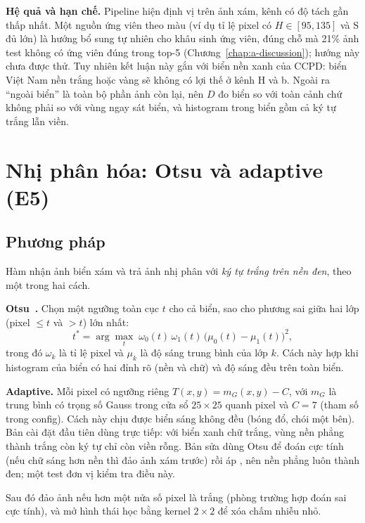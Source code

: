 \textbf{Hệ quả và hạn chế.} Pipeline hiện định vị trên ảnh xám, kênh có độ tách gần thấp nhất. Một nguồn ứng viên theo màu (ví dụ tỉ lệ pixel có $H\in[95,135]$ và S đủ lớn) là hướng bổ sung tự nhiên cho khâu sinh ứng viên, đúng chỗ mà 21\% ảnh test không có ứng viên đúng trong top-5 (Chương~\ref{chap:a-discussion}); hướng này chưa được thử. Tuy nhiên kết luận này gắn với biển nền xanh của CCPD: biển Việt Nam nền trắng hoặc vàng sẽ không có lợi thế ở kênh H và b. Ngoài ra ``ngoài biển'' là toàn bộ phần ảnh còn lại, nên $D$ đo biển so với toàn cảnh chứ không phải so với vùng ngay sát biển, và histogram trong biển gồm cả ký tự trắng lẫn viền.

\section{Nhị phân hóa: Otsu và adaptive (E5)}
\label{sec:b-binarize}

\subsection{Phương pháp}

Hàm  nhận ảnh biển xám và trả ảnh nhị phân với \emph{ký tự trắng trên nền đen}, theo một trong hai cách.

\textbf{Otsu~\cite{otsu}.} Chọn một ngưỡng toàn cục $t$ cho cả biển, sao cho phương sai giữa hai lớp (pixel $\le t$ và $>t$) lớn nhất:
\[
t^{*}=\arg\max_{t}\;\omega_0(t)\,\omega_1(t)\,\big(\mu_0(t)-\mu_1(t)\big)^2,
\]
trong đó $\omega_k$ là tỉ lệ pixel và $\mu_k$ là độ sáng trung bình của lớp $k$. Cách này hợp khi histogram của biển có hai đỉnh rõ (nền và chữ) và độ sáng đều trên toàn biển.

\textbf{Adaptive.} Mỗi pixel có ngưỡng riêng $T(x,y)=m_G(x,y)-C$, với $m_G$ là trung bình có trọng số Gauss trong cửa sổ $25\times 25$ quanh pixel và $C=7$ (tham số  trong config). Cách này chịu được biển sáng không đều (bóng đổ, chói một bên). Bản cài đặt đầu tiên dùng  trực tiếp: với biển xanh chữ trắng, vùng nền phẳng thành trắng còn ký tự chỉ còn viền rỗng. Bản sửa dùng Otsu để đoán cực tính (nếu chữ sáng hơn nền thì đảo ảnh xám trước) rồi áp , nên nền phẳng luôn thành đen; một test đơn vị kiểm tra điều này.

Sau đó  đảo ảnh nếu hơn một nửa số pixel là trắng (phòng trường hợp đoán sai cực tính), và  mở hình thái học bằng kernel $2\times 2$ để xóa chấm nhiễu nhỏ.

